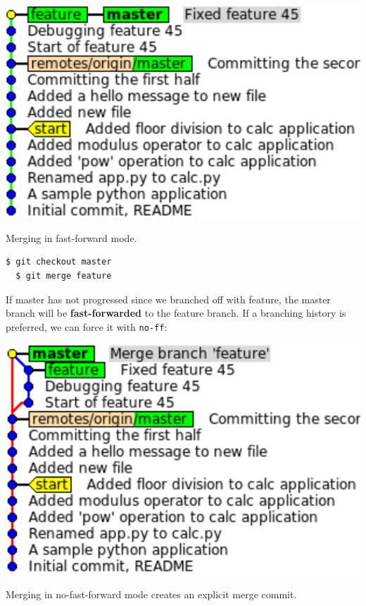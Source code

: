 \documentclass{../common/tufte-latex/tufte-handout}
\begin{document}
\begin{marginfigure}%
  \centering
  \includegraphics[width=\linewidth]{gitmerge-ff.pdf}
  \label{fig:gitmerge-ff}
  \caption{Merging in fast-forward mode.}
\end{marginfigure}

\begin{lstlisting}[style=BashInputStyle]
  $ git checkout master
  $ git merge feature
\end{lstlisting}

If master has not progressed since we branched off with feature, the master branch will be \textbf{fast-forwarded} to the feature branch.
If a branching history is preferred, we can force it with \texttt{no-ff}:

\begin{marginfigure}%
  \centering
  \includegraphics[width=\linewidth]{gitmerge-noff.pdf}
  \label{fig:gitmerge-noff}
  \caption{Merging in no-fast-forward mode creates an explicit merge commit.}
\end{marginfigure}
\end{document}
